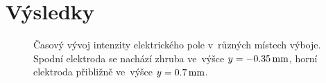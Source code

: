 \section{Výsledky}
\label{sec:efish-results}

\begin{figure}[p]
	\makebox[\textwidth]{}
	\caption{Časový vývoj intenzity elektrického pole
		v~různých místech výboje.
		Spodní elektroda se nachází zhruba ve~výšce
		$y = \SI{-0.35}{\milli\metre}$,
		horní elektroda přibližně ve~výšce
		$y = \SI{0.7}{\milli\metre}$.}
\end{figure}
